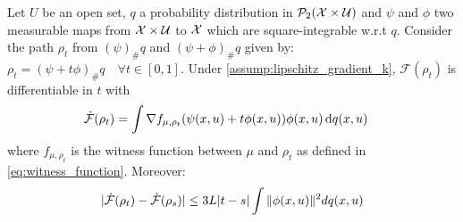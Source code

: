 \begin{lemma}\label{lem:derivative_mmd_augmented}
Let $U$ be an open set, $q$ a probability distribution in $\mathcal{P}_2({{\mathcal X}} \times \mathcal{U})$ and $\psi$ and $\phi$ two measurable maps from  ${{\mathcal X}} \times\mathcal{U} $ to ${{\mathcal X}}$  which are square-integrable w.r.t $q$. Consider the path $\rho_t$ from  $(\psi)_{\#}q$ and $(\psi+\phi)_{\#}q$ given by: $\rho_t=  (\psi+t\phi)_{\#}q \quad \forall t\in [0,1]$. Under \cref{assump:lipschitz_gradient_k}, $\mathcal{F}(\rho_t)$ is differentiable in $t$ with
	\begin{align*}
		\dot{{{\mathcal F}}}(\rho_t)&=\int \nabla f_{\mu,\rho_t}(\psi(x,u)+t\phi(x,u)) \phi(x,u)\mathop{}\!\mathrm{d} q(x,u)
	\end{align*}
where $f_{\mu,\rho_t}$ is the witness function between $\mu$ and $\rho_t$ as defined in \cref{eq:witness_function}.	
Moreover:
\begin{align*}
		\vert \dot{{{\mathcal F}}}(\rho_t) - \dot{{{\mathcal F}}}(\rho_s) \vert \leq 3L\vert t-s \vert\int \Vert \phi(x,u) \Vert^2 dq(x,u)
\end{align*}
\end{lemma}
